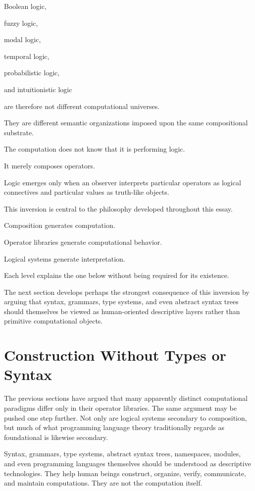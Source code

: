 \documentclass[12pt,oneside]{article}
\begin{document}
Boolean logic,

fuzzy logic,

modal logic,

temporal logic,

probabilistic logic,

and intuitionistic logic

are therefore not different computational universes.

They are different semantic organizations imposed upon the same compositional substrate.

The computation does not know that it is performing logic.

It merely composes operators.

Logic emerges only when an observer interprets particular operators as logical connectives and particular values as truth-like objects.

This inversion is central to the philosophy developed throughout this essay.

Composition generates computation.

Operator libraries generate computational behavior.

Logical systems generate interpretation.

Each level explains the one below without being required for its existence.

The next section develops perhaps the strongest consequence of this inversion by arguing that syntax, grammars, type systems, and even abstract syntax trees should themselves be viewed as human-oriented descriptive layers rather than primitive computational objects.

\section{Construction Without Types or Syntax}

The previous sections have argued that many apparently distinct computational paradigms differ only in their operator libraries. The same argument may be pushed one step further. Not only are logical systems secondary to composition, but much of what programming language theory traditionally regards as foundational is likewise secondary.

Syntax, grammars, type systems, abstract syntax trees, namespaces, modules, and even programming languages themselves should be understood as descriptive technologies. They help human beings construct, organize, verify, communicate, and maintain computations. They are not the computation itself.
\end{document}

